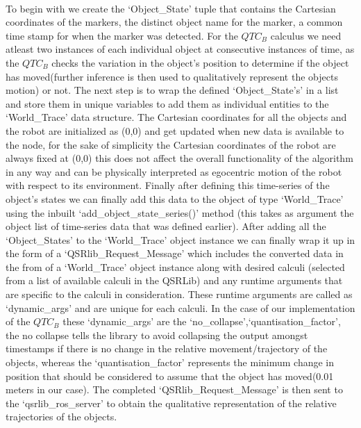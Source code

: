 \paragraph{}To begin with we create the `Object\_State' tuple that contains the Cartesian coordinates of the markers, the distinct object name for the marker, a common time stamp for when the marker was detected. For the $QTC_B$ calculus we need atleast two instances of each individual object at consecutive instances of time, as the $QTC_B$ checks the variation in the object's position to determine if the object has moved(further inference is then used to qualitatively represent the objects motion) or not. The next step is to wrap the defined `Object\_State's' in a list and store them in unique variables to add them as individual entities to the `World\_Trace' data structure. The Cartesian coordinates for all the objects and the robot are initialized as (0,0) and get updated when new data is available to the node, for the sake of simplicity the Cartesian coordinates of the robot are always fixed at (0,0) this does not affect the overall functionality of the algorithm in any way and can be physically interpreted as egocentric motion of the robot with respect to its environment. Finally after defining this time-series of the object's states we can finally add this data to the object of type `World\_Trace' using the inbuilt `add\_object\_state\_series()' method (this takes as argument the object list of time-series data that was defined earlier). After adding all the `Object\_States' to the `World\_Trace' object instance we can finally wrap it up in the form of a `QSRlib\_Request\_Message' which includes the converted data in the from of a `World\_Trace' object instance along with desired calculi (selected from a list of available calculi in the QSRLib) and any runtime arguments that are specific to the calculi in  consideration. These runtime arguments are called as `dynamic\_args' and are unique for each calculi. In the case of our implementation of the $QTC_B$ these `dynamic\_args' are the `no\_collapse',`quantisation\_factor', the no collapse tells the library to avoid collapsing the output amongst timestamps if there is no change in the relative movement/trajectory of the objects, whereas the `quantisation\_factor' represents the minimum change in position that should be considered to assume that the object has moved(0.01 meters in our case). The completed `QSRlib\_Request\_Message' is then sent to the `qsrlib\_ros\_server' to obtain the qualitative representation of the relative trajectories of the objects.

